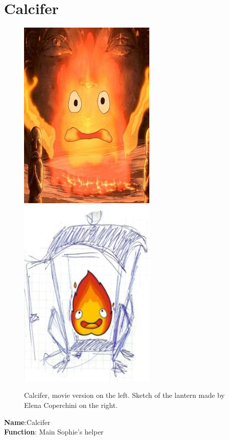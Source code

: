 \section{Calcifer}

\begin{figure}[H]
  {\includegraphics{Images/Characters/calcifer}}		
  \qquad%
      {\includegraphics{Images/Characters/lantern}}
      \caption{Calcifer, movie version on the left. Sketch of the lantern made by Elena Coperchini on the right.}
\end{figure}

\textbf{Name}:Calcifer \\
\textbf{Function}: Main Sophie's helper


